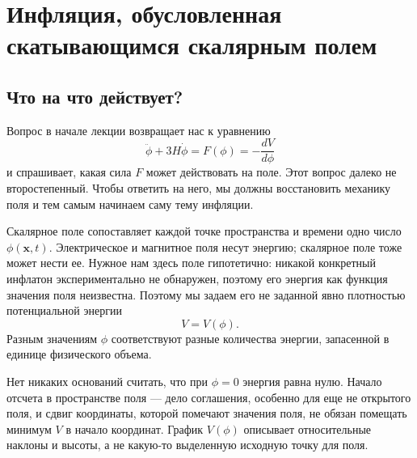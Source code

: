 \chapter{Инфляция, обусловленная скатывающимся скалярным полем}


\section{Что на что действует?}

Вопрос в начале лекции возвращает нас к уравнению
\begin{equation}
\ddot\phi+3H\dot\phi
=F(\phi)
=-\frac{dV}{d\phi}
\label{eq:c09-opening}
\end{equation}
и спрашивает, какая сила \(F\) может действовать на поле. Этот вопрос далеко не второстепенный. Чтобы ответить на него, мы должны восстановить механику поля и тем самым начинаем саму тему инфляции.

Скалярное поле сопоставляет каждой точке пространства и времени одно число \(\phi(\mathbf x,t)\). Электрическое и магнитное поля несут энергию; скалярное поле тоже может нести ее. Нужное нам здесь поле гипотетично: никакой конкретный инфлатон экспериментально не обнаружен, поэтому его энергия как функция значения поля неизвестна. Поэтому мы задаем его не заданной явно плотностью потенциальной энергии
\begin{equation}
V=V(\phi).
\label{eq:c09-potential}
\end{equation}
Разным значениям \(\phi\) соответствуют разные количества энергии, запасенной в единице физического объема.

Нет никаких оснований считать, что при \(\phi=0\) энергия равна нулю. Начало отсчета в пространстве поля — дело соглашения, особенно для еще не открытого поля, и сдвиг координаты, которой помечают значения поля, не обязан помещать минимум \(V\) в начало координат. График \(V(\phi)\) описывает относительные наклоны и высоты, а не какую-то выделенную исходную точку для поля.

